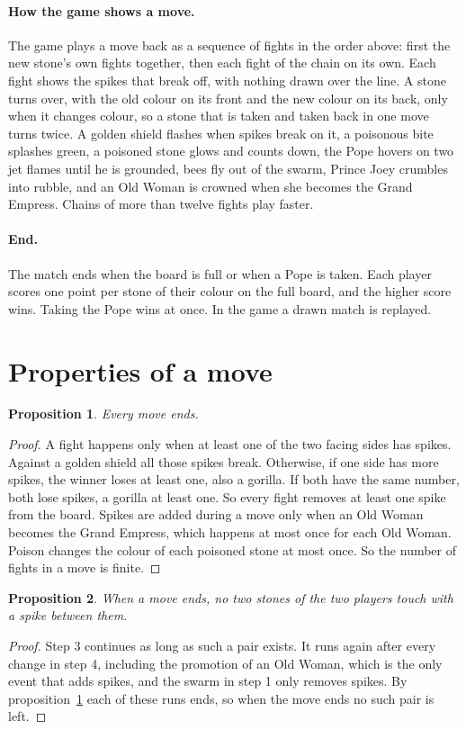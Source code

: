 \documentclass[11pt,a4paper]{article}
\newtheorem{proposition}{Proposition}
\begin{document}
\paragraph{How the game shows a move.} The game plays a move back as a sequence of fights in the order above: first the new stone's own fights together, then each fight of the chain on its own. Each fight shows the spikes that break off, with nothing drawn over the line. A stone turns over, with the old colour on its front and the new colour on its back, only when it changes colour, so a stone that is taken and taken back in one move turns twice. A golden shield flashes when spikes break on it, a poisonous bite splashes green, a poisoned stone glows and counts down, the Pope hovers on two jet flames until he is grounded, bees fly out of the swarm, Prince Joey crumbles into rubble, and an Old Woman is crowned when she becomes the Grand Empress. Chains of more than twelve fights play faster.

\paragraph{End.} The match ends when the board is full or when a Pope is taken. Each player scores one point per stone of their colour on the full board, and the higher score wins. Taking the Pope wins at once. In the game a drawn match is replayed.

\section{Properties of a move}

\begin{proposition}\label{prop:ends}
Every move ends.
\end{proposition}
\begin{proof}
A fight happens only when at least one of the two facing sides has spikes. Against a golden shield all those spikes break. Otherwise, if one side has more spikes, the winner loses at least one, also a gorilla. If both have the same number, both lose spikes, a gorilla at least one. So every fight removes at least one spike from the board. Spikes are added during a move only when an Old Woman becomes the Grand Empress, which happens at most once for each Old Woman. Poison changes the colour of each poisoned stone at most once. So the number of fights in a move is finite.
\end{proof}

\begin{proposition}\label{prop:clean}
When a move ends, no two stones of the two players touch with a spike between them.
\end{proposition}
\begin{proof}
Step 3 continues as long as such a pair exists. It runs again after every change in step 4, including the promotion of an Old Woman, which is the only event that adds spikes, and the swarm in step 1 only removes spikes. By proposition~\ref{prop:ends} each of these runs ends, so when the move ends no such pair is left.
\end{proof}
\end{document}
